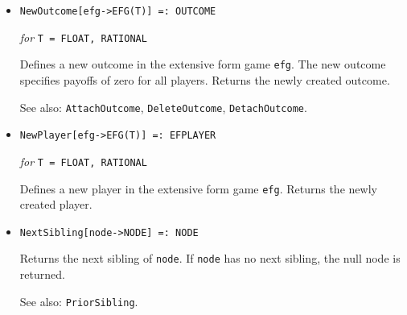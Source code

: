 \begin{itemize}
{\it for} {\tt T = FLOAT, RATIONAL}
\bd
Creates a new normal form game with dimensionality \verb+dim+.
By default, the payoffs and probabilities associated with the game will
be stored as {\tt FLOAT}.  If the \verb+rational+ parameter is specified
and is \verb+True+, these values will be stored as {\tt RATIONAL}.
No initialization of the payoffs of the game is done.
Returns the newly created game.
\ed



\item{}
\protect \large \begin{verbatim} 
NewOutcome[efg->EFG(T)] =: OUTCOME
\end{verbatim}\normalsize

{\it for} {\tt T = FLOAT, RATIONAL} 

\bd 
Defines a new outcome in the extensive form game \verb+efg+.  The new
outcome specifies payoffs of zero for all players.  Returns the newly
created outcome.
\item [See also:] \verb+AttachOutcome+, \verb+DeleteOutcome+,
\verb+DetachOutcome+.
\ed

\item{}
\protect \large \begin{verbatim}
NewPlayer[efg->EFG(T)] =: EFPLAYER 
\end{verbatim}\normalsize

{\it for} {\tt T = FLOAT, RATIONAL} 

\bd 
Defines a new player in the extensive form game \verb+efg+.  Returns
the newly created player.  
\ed

\item{}
\protect \large \begin{verbatim}
NextSibling[node->NODE] =: NODE
\end{verbatim}\normalsize

\bd
Returns the next sibling of \verb+node+.  If \verb+node+ has no next
sibling, the null node is returned.
\item [See also:] \verb+PriorSibling+.
\ed


\end{itemize}
